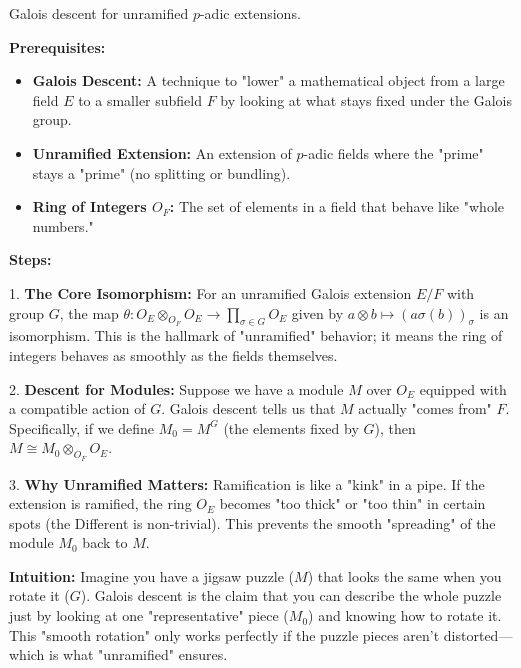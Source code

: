 \begin{exercise}
\label{algebra:2025:4}
Galois descent for unramified $p$-adic extensions.
\end{exercise}

\begin{solution}
\textbf{Prerequisites:}
\begin{itemize}
    \item \textbf{Galois Descent:} A technique to "lower" a mathematical object from a large field $E$ to a smaller subfield $F$ by looking at what stays fixed under the Galois group.
    \item \textbf{Unramified Extension:} An extension of $p$-adic fields where the "prime" stays a "prime" (no splitting or bundling).
    \item \textbf{Ring of Integers $O_F$:} The set of elements in a field that behave like "whole numbers."
\end{itemize}

\textbf{Steps:}

1. \textbf{The Core Isomorphism:} For an unramified Galois extension $E/F$ with group $G$, the map $\theta: O_E \otimes_{O_F} O_E \to \prod_{\sigma \in G} O_E$ given by $a \otimes b \mapsto (a \sigma(b))_{\sigma}$ is an isomorphism. This is the hallmark of "unramified" behavior; it means the ring of integers behaves as smoothly as the fields themselves.

2. \textbf{Descent for Modules:} Suppose we have a module $M$ over $O_E$ equipped with a compatible action of $G$. Galois descent tells us that $M$ actually "comes from" $F$. Specifically, if we define $M_0 = M^G$ (the elements fixed by $G$), then $M \cong M_0 \otimes_{O_F} O_E$.

3. \textbf{Why Unramified Matters:} Ramification is like a "kink" in a pipe. If the extension is ramified, the ring $O_E$ becomes "too thick" or "too thin" in certain spots (the Different is non-trivial). This prevents the smooth "spreading" of the module $M_0$ back to $M$.

\textbf{Intuition:}
Imagine you have a jigsaw puzzle ($M$) that looks the same when you rotate it ($G$). Galois descent is the claim that you can describe the whole puzzle just by looking at one "representative" piece ($M_0$) and knowing how to rotate it. This "smooth rotation" only works perfectly if the puzzle pieces aren't distorted—which is what "unramified" ensures.

\end{solution}

